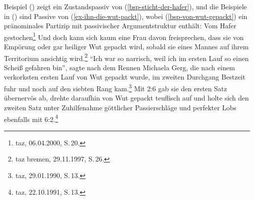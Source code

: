 \noindent
Beispiel () zeigt ein Zustandspassiv von (\ref{bsp-sticht-der-hafer}), und die Beispiele in
() sind Passive von (\ref{ex-ihn-die-wut-packt}), wobei (\ref{bsp-von-wut-gepackt}) ein
pränominales Partizip mit passivischer Argumentstruktur enthält: 
\ea
Vom Hafer gestochen\footnote{
  taz, 06.04.2000, S.\,20.
}
\z
\eal
\label{wut-gepackt}
\ex Und doch kann sich kaum eine Frau davon freisprechen, dass sie von Empörung oder gar heiliger Wut gepackt wird, sobald sie eines Mannes auf ihrem Territorium ansichtig wird.\footnote{
  taz bremen, 29.11.1997, S.\,26.
}
\ex "`Ich war so narrisch, weil ich im ersten Lauf so einen Scheiß gefahren bin"', 
    sagte nach dem Rennen Michaela Gerg, die nach einem verkorksten ersten Lauf von Wut gepackt wurde, 
    im zweiten Durchgang Bestzeit fuhr und noch auf den siebten Rang kam.\footnote{
      taz, 29.01.1990, S.\,13.
    }
\ex\label{bsp-von-wut-gepackt}
Mit 2:6 gab sie den ersten Satz übernervös ab, drehte daraufhin von Wut gepackt teuflisch auf und holte sich den zweiten Satz unter Zuhilfenahme göttlicher Passierschläge und perfekter Lobs ebenfalls mit 6:2.\footnote{
  taz, 22.10.1991, S.\,13.
}
\zl

